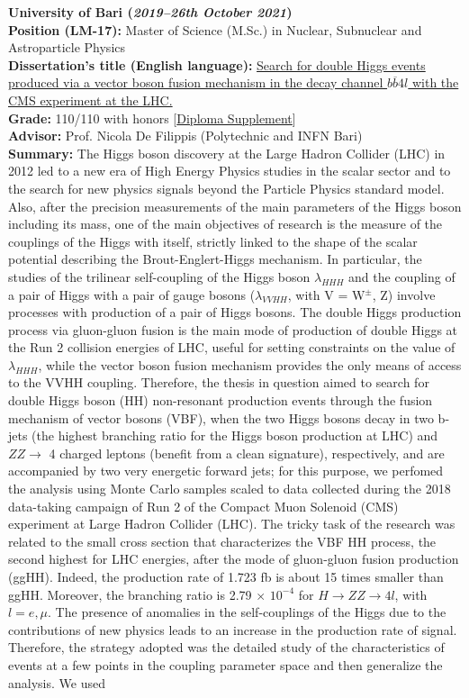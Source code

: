 \documentclass[11pt]{res}
\begin{document}
\begin{resume}
\textbf{University of Bari (\textit{2019--26th October 2021})}\\
\textbf{Position (LM-17):} Master of Science (M.Sc.) in Nuclear, Subnuclear and Astroparticle Physics\\
\textbf{Dissertation's title (English language):}
\href{https://inspirehep.net/literature/1955669}{Search for double Higgs events produced via a vector boson fusion mechanism in the decay channel $b\overline{b}4l$ with the CMS experiment at the LHC.}\\
\textbf{Grade:} 110/110 with honors [\href{https://drive.google.com/file/d/13qAI0iYuqlVBQinnvZXv1eGDBE0ShnbM/view?usp=sharing}{Diploma Supplement}]\\
\textbf{Advisor:} Prof. Nicola De Filippis (Polytechnic and INFN Bari)\\
\textbf{Summary:} The Higgs boson discovery at the Large Hadron Collider (LHC) in 2012 led to a new era of High Energy Physics studies in the scalar sector and to the search for new physics signals beyond the Particle Physics standard model. Also, after the precision measurements of the main parameters of the Higgs boson including its mass, one of the main objectives of research is the measure of the couplings of the Higgs with itself, strictly linked to the shape of the scalar potential describing the Brout-Englert-Higgs mechanism. In particular, the studies of the trilinear self-coupling of the Higgs boson $\lambda_{HHH}$ and the coupling of a pair of Higgs with a pair of gauge bosons ($\lambda_{VVHH}$, with V = W$^{\pm}$, Z) involve processes with production of a pair of Higgs bosons. The double Higgs production process via gluon-gluon fusion is the main mode of production of double Higgs at the Run 2 collision energies of LHC, useful for setting constraints on the value of $\lambda_{HHH}$, while the vector boson fusion mechanism provides the only means of access to the VVHH coupling. Therefore, the thesis in question aimed to search for double Higgs boson (HH) non-resonant production events through the fusion mechanism of vector bosons (VBF), when the two Higgs bosons decay in two b-jets (the highest branching ratio for the Higgs boson production at LHC) and $ZZ \to$ 4 charged leptons (benefit from a clean signature), respectively, and are accompanied by two very energetic forward jets; for this purpose, we perfomed the analysis using Monte Carlo samples scaled to data collected during the 2018 data-taking campaign of Run 2 of the Compact Muon Solenoid (CMS) experiment at Large Hadron Collider (LHC). The tricky task of the research was related to the small cross section that characterizes the VBF HH process, the second highest for LHC energies, after the mode of gluon-gluon fusion production (ggHH). Indeed, the production rate of 1.723 fb is about 15 times smaller than ggHH. Moreover, the branching ratio is 2.79 $\times$ $10^{-4}$ for $H\to ZZ\to 4l$, with $l = e, \mu$. The presence of anomalies in the self-couplings of the Higgs due to the contributions of new physics leads to an increase in the production rate of signal. Therefore, the strategy adopted was the detailed study of the characteristics of events at a few points in the coupling parameter space and then generalize the analysis. We used 
\end{resume}
\end{document}
